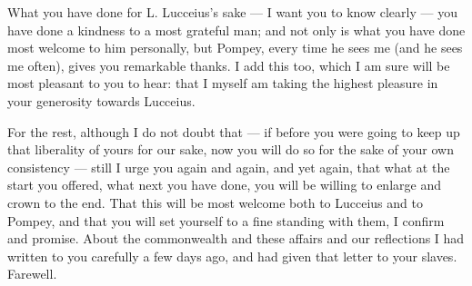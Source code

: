 

 What you have done for L. Lucceius's sake --- I want you to know clearly --- you have done a kindness to a most grateful man; and not only is what you have done most welcome to him personally, but Pompey, every time he sees me (and he sees me often), gives you remarkable thanks. I add this too, which I am sure will be most pleasant to you to hear: that I myself am taking the highest pleasure in your generosity towards Lucceius.

 For the rest, although I do not doubt that --- if before you were going to keep up that liberality of yours for our sake, now you will do so for the sake of your own consistency --- still I urge you again and again, and yet again, that what at the start you offered, what next you have done, you will be willing to enlarge and crown to the end. That this will be most welcome both to Lucceius and to Pompey, and that you will set yourself to a fine standing with them, I confirm and promise. About the commonwealth and these affairs and our reflections I had written to you carefully a few days ago, and had given that letter to your slaves. Farewell.

